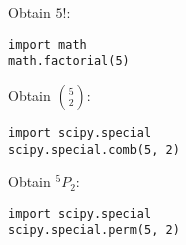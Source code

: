 \documentclass{article}
\begin{document}
\begin{multicols}{2}
        Obtain \(5!\):

        \begin{verbatim}
import math
math.factorial(5)
        \end{verbatim}

        Obtain \({5 \choose 2}\):

        \begin{verbatim}
import scipy.special
scipy.special.comb(5, 2)
        \end{verbatim}

        Obtain \(^5 P_2\):

        \begin{verbatim}
import scipy.special
scipy.special.perm(5, 2)
        \end{verbatim}


\end{multicols}
\end{document}

